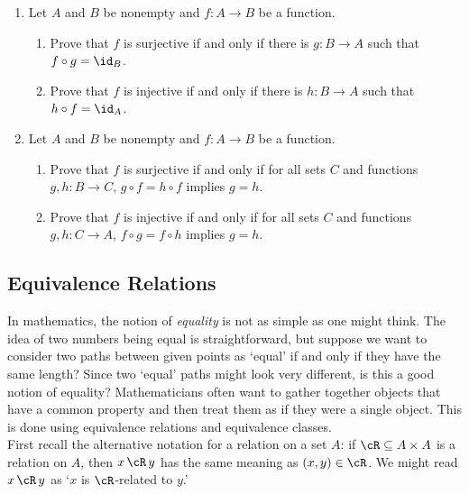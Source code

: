 \begin{enumerate}
\item Let $A$ and $B$ be nonempty and $f : A \to B$ be a function. 
\begin{enumerate}
    \item Prove that $f$ is surjective if and only if there is $g : B \to A$ such that $f \circ g = \id_B$.
    \item Prove that $f$ is injective if and only if there is $h : B \to A$ such that $h \circ f = \id_A$.
\end{enumerate}

\item Let $A$ and $B$ be nonempty and $f : A \to B$ be a function. 
\begin{enumerate}
    \item Prove that $f$ is surjective if and only if for all sets $C$ and functions $g,h : B \to C$, $g \circ f = h \circ f$ implies $g = h$.
    \item Prove that $f$ is injective if and only if for all sets $C$ and functions $g,h : C \to A$, $f \circ g = f \circ h$ implies $g = h$.
\end{enumerate}
\end{enumerate}
\newpage

\subsection{Equivalence Relations}\label{sec:equiv}

In mathematics, the notion of \emph{equality} is not as simple as one might think. The idea of two numbers being equal is straightforward, but suppose we want to consider two paths between given points as `equal' if and only if they have the same length? Since two `equal' paths might look very different, is this a good notion of equality? Mathematicians often want to gather together objects that have a common property and then treat them as if they were a single object. This is done using equivalence relations and equivalence classes.\\

\noindent First recall the alternative notation for a relation on a set $A$: if $\cR\subseteq A\times A$ is a relation on $A$, then $x\,\cR\,y$ has the same meaning as $(x,y)\in\cR$. We might read $x\,\cR\,y$ as `$x$ is $\cR$-related to $y$.'

\newsavebox\mybox
{}
\def\refl{\makebox[\wd\mybox][l]{\emph{Reflexivity}}}
\def\symm{\makebox[\wd\mybox][l]{\emph{Symmetry}}}
\def\trans{\makebox[\wd\mybox][l]{\emph{Transitivity}}}

